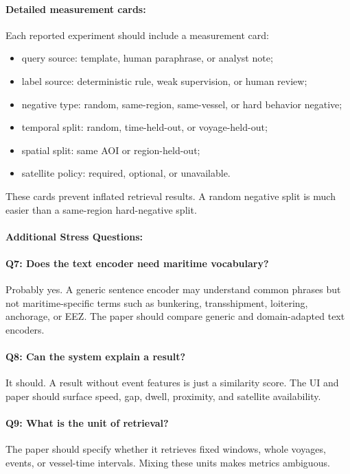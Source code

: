 \documentclass{article}
\begin{document}
\paragraph{Detailed measurement cards:}

Each reported experiment should include a measurement card:
\begin{itemize}
  \item query source: template, human paraphrase, or analyst note;
  \item label source: deterministic rule, weak supervision, or human review;
  \item negative type: random, same-region, same-vessel, or hard behavior negative;
  \item temporal split: random, time-held-out, or voyage-held-out;
  \item spatial split: same AOI or region-held-out;
  \item satellite policy: required, optional, or unavailable.
\end{itemize}
These cards prevent inflated retrieval results. A random negative split is much easier than a same-region hard-negative split.

\paragraph{Additional Stress Questions:}

\paragraph{Q7: Does the text encoder need maritime vocabulary?}
Probably yes. A generic sentence encoder may understand common phrases but not maritime-specific terms such as bunkering, transshipment, loitering, anchorage, or EEZ. The paper should compare generic and domain-adapted text encoders.

\paragraph{Q8: Can the system explain a result?}
It should. A result without event features is just a similarity score. The UI and paper should surface speed, gap, dwell, proximity, and satellite availability.

\paragraph{Q9: What is the unit of retrieval?}
The paper should specify whether it retrieves fixed windows, whole voyages, events, or vessel-time intervals. Mixing these units makes metrics ambiguous.
\end{document}
